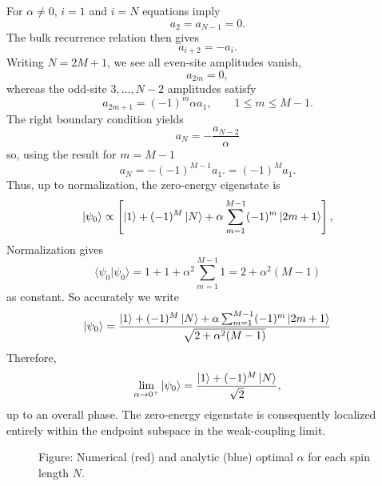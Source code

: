 \documentclass[../../../main.tex]{subfiles}
\begin{document}
For $\alpha\neq0$, $i=1$ and $i=N$ equations imply
\begin{equation*}
  a_2=a_{N-1}=0.
\end{equation*}
The bulk recurrence relation then gives
\begin{equation*}
  a_{i+2}=-a_{i}.
\end{equation*}
Writing $N=2M+1$, we see all even-site amplitudes vanish,
\begin{equation*}
  a_{2m}=0,
\end{equation*}
whereas the odd-site $3,\dots,N-2$ amplitudes satisfy
\begin{equation*}
  a_{2m+1}=(-1)^m\alpha a_1,
  \qquad
  1\leq m\leq M-1.
\end{equation*}
The right boundary condition yields
\begin{equation*}
  a_N=-\frac{a_{N-2}}{\alpha}
\end{equation*}
so, using the result for $m=M-1$
\begin{equation*}
  a_N = -(-1)^{M-1} a_1.=(-1)^M a_1.
\end{equation*}
Thus, up to normalization, the zero-energy eigenstate is
\begin{equation*}
  \ket{\psi_0}
  \propto
  \left[\ket{1}+(-1)^M\ket{N}+\alpha\sum_{m=1}^{M-1}(-1)^m\ket{2m+1}\right],
\end{equation*}
Normalization gives
\begin{equation*}
  \langle\psi_0|\psi_0\rangle = 1+1+ \alpha^2\sum_{m=1}^{M-1}1=2+\alpha^2(M-1)
\end{equation*}
as constant.
So accurately we write
\begin{equation*}
  \ket{\psi_0}
  =
  \frac{\ket{1}+(-1)^M\ket{N}+ \alpha \sum_{m=1}^{M-1}(-1)^m\ket{2m+1}}{\sqrt{2+\alpha^2(M-1)}}
\end{equation*}
Therefore,
\begin{equation*}
  \lim_{\alpha\rightarrow0^+}
  \ket{\psi_0}=
  \frac{
    \ket{1}+(-1)^M\ket{N}
  }{\sqrt{2}},
\end{equation*}
up to an overall phase. The zero-energy eigenstate is consequently localized entirely within the endpoint subspace in the weak-coupling limit.

\begin{figure}
  \centering
  \caption*{Figure: Numerical (red) and analytic (blue) optimal $\alpha$ for each spin length $N$.}
\end{figure}
\end{document}
